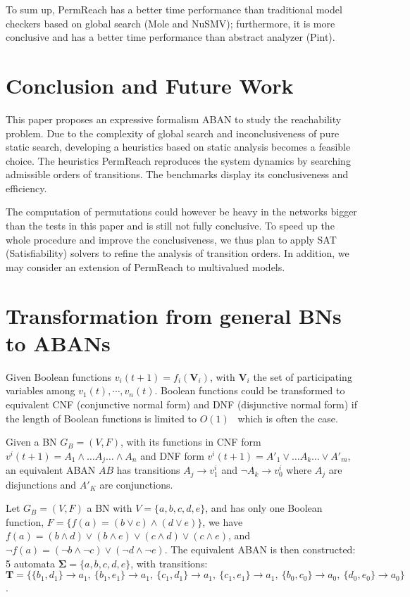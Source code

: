 \documentclass[runningheads]{llncs}
\newcommand{\acm}[3]{\{#1\}\rightarrow#3}
\begin{document}
To sum up, PermReach has a better time performance than traditional model checkers based on global search (Mole and NuSMV); furthermore, it is more conclusive and has a better time performance than abstract analyzer (Pint).

\section{Conclusion and Future Work}\label{sect:6}
This paper proposes an expressive formalism ABAN to study the reachability problem. 
Due to the complexity of global search and inconclusiveness of pure static search, developing a heuristics based on static analysis becomes a feasible choice.
The heuristics PermReach reproduces the system dynamics by searching admissible orders of transitions.
The benchmarks display its conclusiveness and efficiency.

The computation of permutations could however be heavy in the networks bigger than the tests in this paper and is still not fully conclusive. 
To speed up the whole procedure and improve the conclusiveness, we thus plan to apply SAT (Satisfiability) solvers to refine the analysis of transition orders. 
In addition, we may consider an extension of PermReach to multivalued models.


%


\appendix
\section{Transformation from general BNs to ABANs}\label{appendix:trans}

Given Boolean functions $v_i(t+1)=f_i(\mathbf{V}_i)$, with $\mathbf{V}_i$ the set of participating variables among $v_1(t),\cdots,v_n(t)$.
Boolean functions could be transformed to equivalent CNF (conjunctive normal form) and DNF (disjunctive normal form) if the length of Boolean functions is limited to $O(1)$~\cite{miltersen2005converting} which is often the case.
\begin{proposition}
Given a BN $G_B=(V,F)$, with its functions in CNF form $v^i(t+1)=A_1\land\ldots A_j \ldots\land A_n$ and DNF form $v^i(t+1)=A'_1\lor\ldots A_k\ldots\lor A'_m$, an equivalent ABAN $AB$ has transitions $A_j\to v^i_1$ and $\lnot A_k\to v^i_0$ where $A_j$ are disjunctions and $A'_K$ are conjunctions.
\end{proposition}
\begin{example}
Let $G_B=(V,F)$ a BN with $V=\{a,b,c,d,e\}$, and has only one Boolean function, $F=\{f(a)= (b\lor c)\land(d\lor e)\}$, we have 
$f(a)=(b\land d)\lor(b\land e)\lor(c\land d)\lor(c\land e)$, and $\lnot f(a)=(\lnot b\land \lnot c)\lor(\lnot d\land \lnot e)$. 
The equivalent ABAN is then constructed: 5 automata $\mathbf{\Sigma}=\{a,b,c,d,e\}$, with transitions: $\mathbf{T}=\{\acm{b_1,d_1}{a_0}{a_1},\ \acm{b_1,e_1}{a_0}{a_1},\ \acm{c_1,d_1}{a_0}{a_1},\ \acm{c_1,e_1}{a_0}{a_1},\ \acm{b_0,c_0}{a_1}{a_0},\ \acm{d_0,e_0}{a_1}{a_0}\}$.
\end{example}
\end{document}
